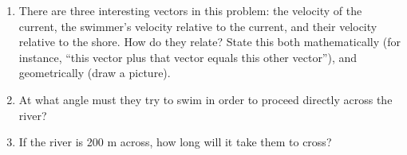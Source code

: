 \documentclass[12pt]{article}
\begin{document}
\begin{enumerate}
\item There are three interesting vectors in this problem: the velocity of the current, the swimmer's velocity relative to the current, and their velocity relative to the shore. How do they relate? State this both mathematically (for instance, ``this vector plus that vector equals this other vector''), and geometrically (draw a picture).
\vspace{3in}











\item At what angle must they try to swim in order to proceed directly across the river?





\vspace{1.5in}




\item If the river is 200 m across, how long will it take them to cross?

\end{enumerate}
\end{document}
